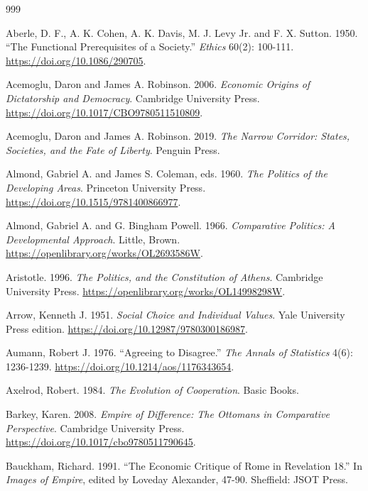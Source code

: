 \documentclass[11pt,letterpaper]{article}
\theoremstyle{definition}
\theoremstyle{remark}
\begin{document}
\begin{small}
\begin{thebibliography}{999}

Aberle, D. F., A. K. Cohen, A. K. Davis, M. J. Levy Jr. and F. X. Sutton. 1950. ``The Functional Prerequisites of a Society.'' \emph{Ethics} 60(2): 100-111. \url{https://doi.org/10.1086/290705}.

Acemoglu, Daron and James A. Robinson. 2006. \emph{Economic Origins of Dictatorship and Democracy}. Cambridge University Press. \url{https://doi.org/10.1017/CBO9780511510809}.

Acemoglu, Daron and James A. Robinson. 2019. \emph{The Narrow Corridor: States, Societies, and the Fate of Liberty}. Penguin Press.

Almond, Gabriel A. and James S. Coleman, eds. 1960. \emph{The Politics of the Developing Areas}. Princeton University Press. \url{https://doi.org/10.1515/9781400866977}.

Almond, Gabriel A. and G. Bingham Powell. 1966. \emph{Comparative Politics: A Developmental Approach}. Little, Brown. \url{https://openlibrary.org/works/OL2693586W}.

Aristotle. 1996. \emph{The Politics, and the Constitution of Athens}. Cambridge University Press. \url{https://openlibrary.org/works/OL14998298W}.

Arrow, Kenneth J. 1951. \emph{Social Choice and Individual Values}. Yale University Press edition. \url{https://doi.org/10.12987/9780300186987}.

Aumann, Robert J. 1976. ``Agreeing to Disagree.'' \emph{The Annals of Statistics} 4(6): 1236-1239. \url{https://doi.org/10.1214/aos/1176343654}.

Axelrod, Robert. 1984. \emph{The Evolution of Cooperation}. Basic Books.

Barkey, Karen. 2008. \emph{Empire of Difference: The Ottomans in Comparative Perspective}. Cambridge University Press. \url{https://doi.org/10.1017/cbo9780511790645}.

Bauckham, Richard. 1991. ``The Economic Critique of Rome in Revelation 18.'' In \emph{Images of Empire}, edited by Loveday Alexander, 47-90. Sheffield: JSOT Press.


\end{thebibliography}
\end{small}
\end{document}
